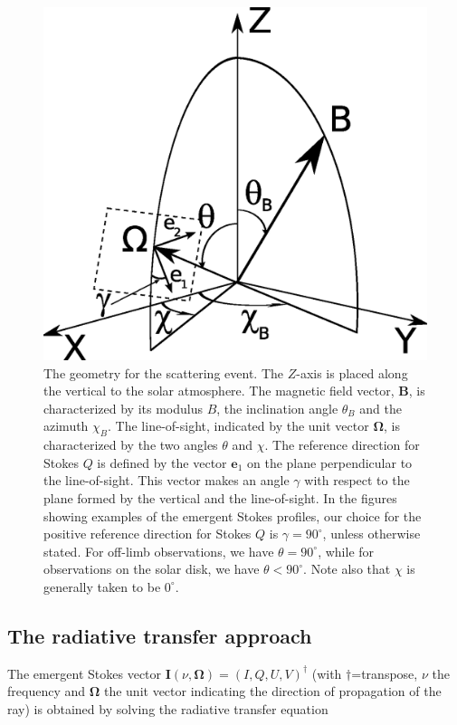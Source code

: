 \documentclass[12pt]{article}
\begin{document}
\begin{figure}
\includegraphics[width=\columnwidth]{f1.eps}
\caption{The geometry for the scattering event. The $Z$-axis is placed along the vertical
to the solar atmosphere. The magnetic field vector,
$\mathbf{B}$,
is characterized by its modulus $B$, the inclination angle $\theta_B$ and
the azimuth $\chi_B$. The line-of-sight, indicated by the unit vector
$\mathbf{\Omega}$,
is characterized by the two angles $\theta$ and $\chi$.
The reference direction for Stokes $Q$ is defined by the vector $\mathbf{e}_1$
on the plane
perpendicular to the line-of-sight. This vector makes an angle $\gamma$ with
respect to the plane formed by
the vertical and the line-of-sight. In the figures showing examples of the
emergent Stokes profiles, our
choice for the positive reference direction for Stokes $Q$ is $\gamma=90^\circ$, unless otherwise stated.
For off-limb observations, we have $\theta=90^\circ$, while for observations
on the solar disk, we have $\theta<90^\circ$. Note also that $\chi$ is generally taken to be $0^\circ$.
\label{fig:geometry}}
\end{figure}

\subsection{The radiative transfer approach}
\label{sec:radiative_transfer}
The emergent Stokes vector $\mathbf{I}(\nu,\mathbf{\Omega})=(I,Q,U,V)^{\dag}$
(with $\dag$=transpose, $\nu$ the frequency and $\mathbf{\Omega}$ the unit vector indicating 
the direction of propagation of the ray) is obtained by solving the radiative transfer equation
\end{document}
